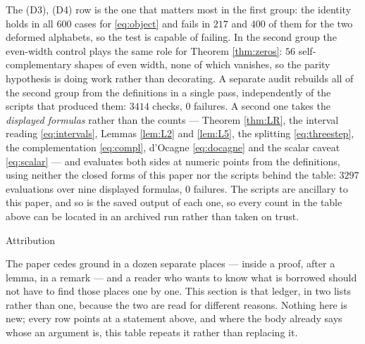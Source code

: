 \documentclass[11pt,reqno]{amsart}
\makeatletter
\renewcommand\section{\@startsection{section}{1}%
  \z@{\linespacing\@plus\linespacing}{.5\linespacing}%
  {\normalfont\large\bfseries\centering}}
\theoremstyle{plain}
\theoremstyle{definition}
\makeatother
\begin{document}
\noindent The (D3), (D4) row is the one that matters most in the first group: the identity holds in
all $600$ cases for \eqref{eq:object} and fails in $217$ and $400$ of them for the two deformed
alphabets, so the test is capable of failing. In the second group the even-width control plays the
same role for Theorem \ref{thm:zeros}: $56$ self-complementary shapes of even width, none of which
vanishes, so the parity hypothesis is doing work rather than decorating. A separate audit rebuilds
all of the second group from the definitions in a single pass, independently of the scripts that
produced them: $3414$ checks, $0$ failures. A second one takes the \emph{displayed formulas} rather
than the counts --- Theorem \ref{thm:LR}, the interval reading \eqref{eq:intervals}, Lemmas
\ref{lem:L2} and \ref{lem:L5}, the splitting \eqref{eq:threestep}, the complementation
\eqref{eq:compl}, d'Ocagne \eqref{eq:docagne} and the scalar caveat \eqref{eq:scalar} --- and
evaluates both sides at numeric points from the definitions, using neither the closed forms of this
paper nor the scripts behind the table: $3297$ evaluations over nine displayed formulas, $0$ failures. The scripts are ancillary to this paper, and so is the
saved output of each one, so every count in the table above can be located in an archived run rather
than taken on trust.

\section{Attribution}\label{sec:attr}

The paper cedes ground in a dozen separate places --- inside a proof, after a lemma, in a remark ---
and a reader who wants to know what is borrowed should not have to find those places one by one.
This section is that ledger, in two lists rather than one, because the two are read for different
reasons. Nothing here is new; every row points at a statement above, and where the body already says
whose an argument is, this table repeats it rather than replacing it.
\end{document}
